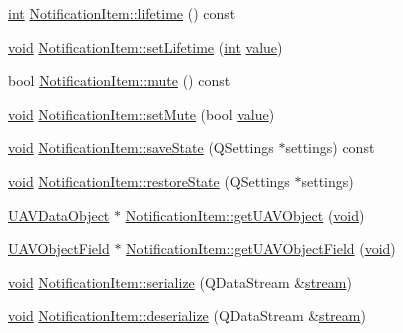 \begin{DoxyCompactItemize}
\hyperlink{ioapi_8h_a787fa3cf048117ba7123753c1e74fcd6}{int} \hyperlink{group__notifyplugin_ga2a7280994bcb9184ba2a3de6aa2d9dd7}{Notification\-Item\-::lifetime} () const 
\item 
\hyperlink{group___u_a_v_objects_plugin_ga444cf2ff3f0ecbe028adce838d373f5c}{void} \hyperlink{group__notifyplugin_gab8ee00149d5b8c0a74ff7fc134bdbd4c}{Notification\-Item\-::set\-Lifetime} (\hyperlink{ioapi_8h_a787fa3cf048117ba7123753c1e74fcd6}{int} \hyperlink{glext_8h_aa0e2e9cea7f208d28acda0480144beb0}{value})
\item 
bool \hyperlink{group__notifyplugin_ga815fa2051096a7c2f3074c60afad5d47}{Notification\-Item\-::mute} () const 
\item 
\hyperlink{group___u_a_v_objects_plugin_ga444cf2ff3f0ecbe028adce838d373f5c}{void} \hyperlink{group__notifyplugin_ga45781a8ec6285e780f592f1b3952b407}{Notification\-Item\-::set\-Mute} (bool \hyperlink{glext_8h_aa0e2e9cea7f208d28acda0480144beb0}{value})
\item 
\hyperlink{group___u_a_v_objects_plugin_ga444cf2ff3f0ecbe028adce838d373f5c}{void} \hyperlink{group__notifyplugin_ga9ba0eb664828ae93d16faaa783b77cfc}{Notification\-Item\-::save\-State} (Q\-Settings $\ast$settings) const 
\item 
\hyperlink{group___u_a_v_objects_plugin_ga444cf2ff3f0ecbe028adce838d373f5c}{void} \hyperlink{group__notifyplugin_gad7dea9a755d75cd820f3b06131f52a1d}{Notification\-Item\-::restore\-State} (Q\-Settings $\ast$settings)
\item 
\hyperlink{class_u_a_v_data_object}{U\-A\-V\-Data\-Object} $\ast$ \hyperlink{group__notifyplugin_ga5f16bd85e4ffd982c71b75abbb00833d}{Notification\-Item\-::get\-U\-A\-V\-Object} (\hyperlink{group___u_a_v_objects_plugin_ga444cf2ff3f0ecbe028adce838d373f5c}{void})
\item 
\hyperlink{class_u_a_v_object_field}{U\-A\-V\-Object\-Field} $\ast$ \hyperlink{group__notifyplugin_gad80a60dd673d057f2fdd45e79f8b8905}{Notification\-Item\-::get\-U\-A\-V\-Object\-Field} (\hyperlink{group___u_a_v_objects_plugin_ga444cf2ff3f0ecbe028adce838d373f5c}{void})
\item 
\hyperlink{group___u_a_v_objects_plugin_ga444cf2ff3f0ecbe028adce838d373f5c}{void} \hyperlink{group__notifyplugin_gad39b4705bd8ee634abb8a8922450613b}{Notification\-Item\-::serialize} (Q\-Data\-Stream \&\hyperlink{ioapi_8h_a4ed0a20697a8c37f8af699a8ec6d76a8}{stream})
\item 
\hyperlink{group___u_a_v_objects_plugin_ga444cf2ff3f0ecbe028adce838d373f5c}{void} \hyperlink{group__notifyplugin_ga02e47b11a2cd7d0e9b608c497afbf359}{Notification\-Item\-::deserialize} (Q\-Data\-Stream \&\hyperlink{ioapi_8h_a4ed0a20697a8c37f8af699a8ec6d76a8}{stream})

\end{DoxyCompactItemize}

